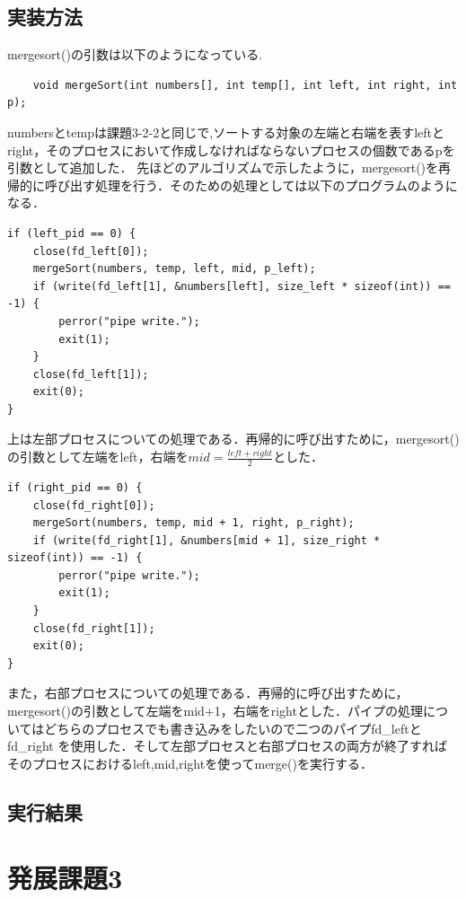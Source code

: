 \documentclass[dvipdfmx]{jarticle}
\begin{document}
\subsection{実装方法}
mergesort()の引数は以下のようになっている.
\begin{lstlisting}
    void mergeSort(int numbers[], int temp[], int left, int right, int p);
\end{lstlisting}
numbersとtempは課題3-2-2と同じで,ソートする対象の左端と右端を表すleftとright，そのプロセスにおいて作成しなければならないプロセスの個数であるpを引数として追加した．
先ほどのアルゴリズムで示したように，mergesort()を再帰的に呼び出す処理を行う．そのための処理としては以下のプログラムのようになる．
\begin{lstlisting}
if (left_pid == 0) {
    close(fd_left[0]);
    mergeSort(numbers, temp, left, mid, p_left);
    if (write(fd_left[1], &numbers[left], size_left * sizeof(int)) == -1) {
        perror("pipe write.");
        exit(1);
    }
    close(fd_left[1]);
    exit(0);
}
\end{lstlisting}
上は左部プロセスについての処理である．再帰的に呼び出すために，mergesort()の引数として左端をleft，右端を$mid = \frac{left+right}{2}$とした．
\begin{lstlisting}
if (right_pid == 0) {
    close(fd_right[0]);
    mergeSort(numbers, temp, mid + 1, right, p_right);
    if (write(fd_right[1], &numbers[mid + 1], size_right * sizeof(int)) == -1) {
        perror("pipe write.");
        exit(1);
    }
    close(fd_right[1]);
    exit(0);
}
\end{lstlisting}
また，右部プロセスについての処理である．再帰的に呼び出すために，mergesort()の引数として左端をmid+1，右端をrightとした．パイプの処理についてはどちらのプロセスでも書き込みをしたいので二つのパイプfd\_leftとfd\_right
を使用した．そして左部プロセスと右部プロセスの両方が終了すればそのプロセスにおけるleft,mid,rightを使ってmerge()を実行する．
\subsection{実行結果}
\section{発展課題3}
\end{document}
